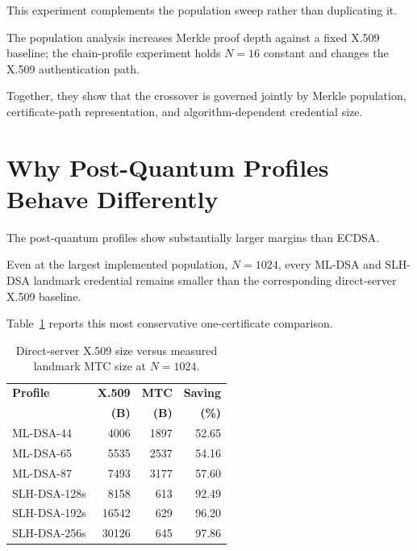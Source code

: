 \documentclass[journal]{IEEEtran}
\begin{document}
This experiment complements the population sweep rather than duplicating it.

The population analysis increases Merkle proof depth against a fixed X.509 baseline; the chain-profile experiment holds $N=16$ constant and changes the X.509 authentication path.

Together, they show that the crossover is governed jointly by Merkle population, certificate-path representation, and algorithm-dependent credential size.



\section{Why Post-Quantum Profiles Behave Differently}



The post-quantum profiles show substantially larger margins than ECDSA.

Even at the largest implemented population, $N=1024$, every ML-DSA and SLH-DSA landmark credential remains smaller than the corresponding direct-server X.509 baseline.

Table~\ref{tab:pq1024} reports this most conservative one-certificate comparison.



\begin{table}[t]

\caption{Direct-server X.509 size versus measured landmark MTC size at $N=1024$.}

\label{tab:pq1024}

\centering

\begin{tabular}{lrrr}

\toprule

\textbf{Profile} & \textbf{X.509} & \textbf{MTC} & \textbf{Saving} \\

& \textbf{(B)} & \textbf{(B)} & \textbf{(\%)} \\

\midrule

ML-DSA-44       & 4006  & 1897 & 52.65 \\

ML-DSA-65       & 5535  & 2537 & 54.16 \\

ML-DSA-87       & 7493  & 3177 & 57.60 \\

SLH-DSA-128s    & 8158  & 613  & 92.49 \\

SLH-DSA-192s    & 16542 & 629  & 96.20 \\

SLH-DSA-256s    & 30126 & 645  & 97.86 \\

\bottomrule

\end{tabular}

\end{table}
\end{document}
